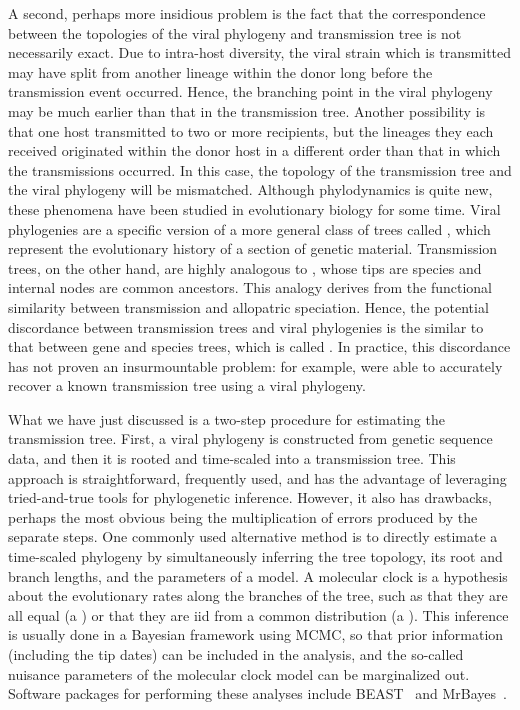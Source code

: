 A second, perhaps more insidious problem is the fact that the correspondence
between the topologies of the viral phylogeny and transmission tree is not
necessarily exact. Due to intra-host diversity, the viral strain which is
transmitted may have split from another lineage within the donor long before
the transmission event occurred. Hence, the branching point in the viral
phylogeny may be much earlier than that in the transmission tree. Another
possibility is that one host transmitted to two or more recipients, but the
lineages they each received originated within the donor host in a different
order than that in which the transmissions occurred. In this case, the topology
of the transmission tree and the viral phylogeny will be mismatched. Although
phylodynamics is quite new, these phenomena have been studied in evolutionary
biology for some time. Viral phylogenies are a specific version of a more
general class of trees called , which represent the
evolutionary history of a section of genetic material. Transmission trees, on
the other hand, are highly analogous to , whose tips are
species and internal nodes are common ancestors. This analogy derives from the
functional similarity between transmission and allopatric speciation. Hence,
the potential discordance between transmission trees and viral phylogenies is
the similar to that between gene and species trees, which is called
. In practice, this discordance has not proven
an insurmountable problem: for example, \textcite{leitner1996accurate} were
able to accurately recover a known transmission tree using a viral phylogeny.

What we have just discussed is a two-step procedure for estimating the
transmission tree. First, a viral phylogeny is constructed from genetic
sequence data, and then it is rooted and time-scaled into a transmission tree.
This approach is straightforward, frequently used, and has the advantage of
leveraging tried-and-true tools for phylogenetic inference. However, it also
has drawbacks, perhaps the most obvious being the multiplication of errors
produced by the separate steps. One commonly used alternative method is to
directly estimate a time-scaled phylogeny by simultaneously inferring the tree
topology, its root and branch lengths, and the parameters of a  model. A molecular clock is a hypothesis about the evolutionary rates
along the branches of the tree, such as that they are all equal (a ) or that they are \gls{iid} from a common distribution (a ). This inference is usually done in a Bayesian framework using
\gls{MCMC}, so that prior information (including the tip dates) can be included
in the analysis, and the so-called nuisance parameters of the molecular clock
model can be marginalized out. Software packages for performing these analyses
include BEAST~\autocite{bouckaert2014beast} and
MrBayes~\autocite{ronquist2012mrbayes}.

